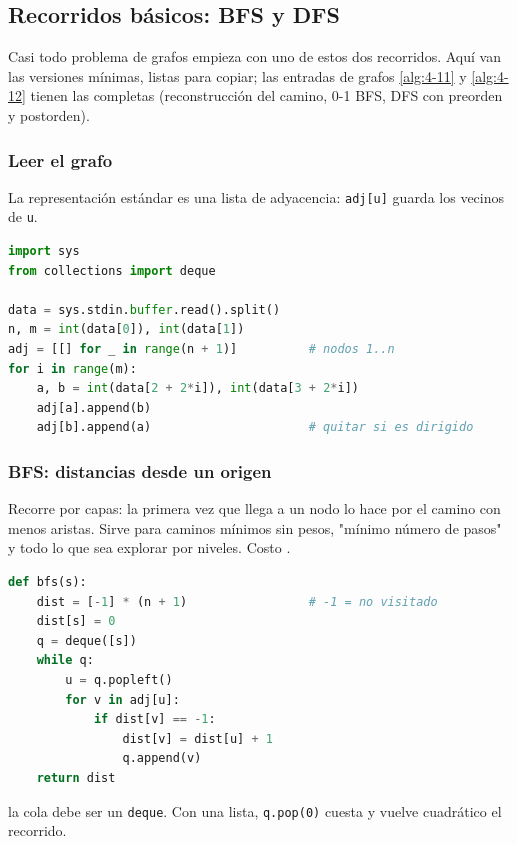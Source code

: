 \subsection{Recorridos básicos: BFS y DFS}
\label{alg:2-9}

Casi todo problema de grafos empieza con uno de estos dos recorridos. Aquí van las
versiones mínimas, listas para copiar; las entradas de grafos \ref{alg:4-11} y \ref{alg:4-12} tienen las
completas (reconstrucción del camino, 0-1 BFS, DFS con preorden y postorden).

\subsubsection{Leer el grafo}

La representación estándar es una lista de adyacencia: \texttt{adj[u]} guarda los
vecinos de \texttt{u}.

\begin{lstlisting}[language=Python]
import sys
from collections import deque

data = sys.stdin.buffer.read().split()
n, m = int(data[0]), int(data[1])
adj = [[] for _ in range(n + 1)]          # nodos 1..n
for i in range(m):
    a, b = int(data[2 + 2*i]), int(data[3 + 2*i])
    adj[a].append(b)
    adj[b].append(a)                      # quitar si es dirigido
\end{lstlisting}

\vspace{0.3cm}
\subsubsection{BFS: distancias desde un origen}

Recorre por capas: la primera vez que llega a un nodo lo hace por el camino con
menos aristas. Sirve para caminos mínimos sin pesos, "mínimo número de pasos" y
todo lo que sea explorar por niveles. Costo .

\begin{lstlisting}[language=Python]
def bfs(s):
    dist = [-1] * (n + 1)                 # -1 = no visitado
    dist[s] = 0
    q = deque([s])
    while q:
        u = q.popleft()
        for v in adj[u]:
            if dist[v] == -1:
                dist[v] = dist[u] + 1
                q.append(v)
    return dist
\end{lstlisting}

 la cola debe ser un \texttt{deque}. Con una lista,
\texttt{q.pop(0)} cuesta  y vuelve cuadrático el recorrido.

